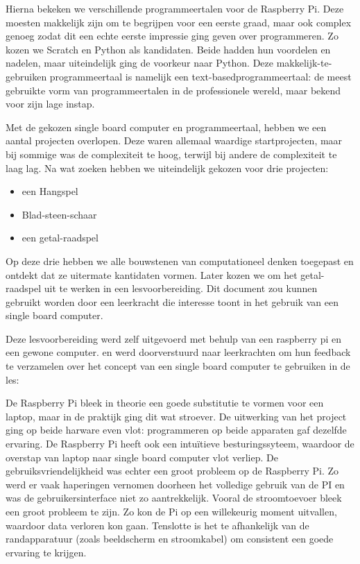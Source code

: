 Hierna bekeken we verschillende programmeertalen voor de Raspberry Pi. Deze moesten makkelijk zijn om te begrijpen voor een eerste graad, maar ook complex genoeg zodat dit een echte eerste impressie ging geven over programmeren. Zo kozen we Scratch en Python als kandidaten. Beide hadden hun voordelen en nadelen, maar uiteindelijk ging de voorkeur naar Python. Deze makkelijk-te-gebruiken programmeertaal is namelijk een text-basedprogrammeertaal: de meest gebruikte vorm van programmeertalen in de professionele wereld, maar bekend voor zijn lage instap. 

Met de gekozen single board computer en programmeertaal, hebben we een aantal projecten overlopen. Deze waren allemaal waardige startprojecten, maar bij sommige was de complexiteit te hoog, terwijl bij andere de complexiteit te laag lag. Na wat zoeken hebben we uiteindelijk gekozen voor drie projecten:
\begin{itemize}
    \item een Hangspel
    \item Blad-steen-schaar
    \item een getal-raadspel
\end{itemize}
Op deze drie hebben we alle bouwstenen van computationeel denken toegepast en ontdekt dat ze uitermate kantidaten vormen. Later kozen we om het getal-raadspel uit te werken in een lesvoorbereiding. Dit document zou kunnen gebruikt worden door een leerkracht die interesse toont in het gebruik van een single board computer.

Deze lesvoorbereiding werd zelf uitgevoerd met behulp van een raspberry pi en een gewone computer. en werd doorverstuurd naar leerkrachten om hun feedback te verzamelen over het concept van een single board computer te gebruiken in de les:

De Raspberry Pi bleek in theorie een goede substitutie te vormen voor een laptop, maar in de praktijk ging dit wat stroever. De uitwerking van het project ging op beide harware even vlot: programmeren op beide apparaten gaf dezelfde ervaring. De Raspberry Pi heeft ook een intuïtieve besturingssyteem, waardoor de overstap van laptop naar single board computer vlot verliep. De gebruiksvriendelijkheid was echter een groot probleem op de Raspberry Pi. Zo werd er vaak haperingen vernomen doorheen het volledige gebruik van de PI en was de gebruikersinterface niet zo aantrekkelijk. Vooral de stroomtoevoer bleek een groot probleem te zijn. Zo kon de Pi op een willekeurig moment uitvallen, waardoor data verloren kon gaan. Tenslotte is het te afhankelijk van de randapparatuur (zoals beeldscherm en stroomkabel) om consistent een goede ervaring te krijgen.

